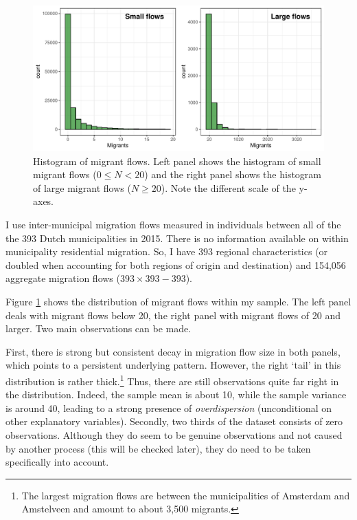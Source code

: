 \documentclass[fleqn,10pt]{SelfArx} %
\begin{document}
        \begin{figure}[t!]\centering %
          \includegraphics[width=0.8\linewidth]{../fig/hist_mig.pdf}
          \caption{Histogram of migrant flows. Left panel shows the
            histogram of small migrant flows ($0 \leq N < 20$) and the right
            panel shows the histogram of large migrant flows
            ($N \geq 20$). Note the different scale of the y-axes.}
          \label{fig:hist_mig}
        \end{figure}


        I use inter-municipal migration flows measured in individuals
        between all of the the 393 Dutch municipalities in 2015. There
        is no information available on within municipality residential
        migration. So, I have 393 regional characteristics (or doubled
        when accounting for both regions of origin and destination)
        and 154,056 aggregate migration flows ($393 \times 393 - 393$).

        Figure \ref{fig:hist_mig} shows the distribution of migrant
        flows within my sample. The left panel deals with migrant
        flows below 20, the right panel with migrant flows of 20 and
        larger. Two main observations can be made.

        First, there is strong but consistent decay in migration flow size in both panels,
        which points to a persistent underlying pattern. However, the
        right `tail' in this distribution is rather thick.\footnote{The
          largest migration flows are between the municipalities of
          Amsterdam and Amstelveen and amount to about 3,500
          migrants.} Thus, there are still observations quite far
        right in the distribution. Indeed, the sample mean is about
        10, while the sample variance is around 40, leading to a
        strong presence of \emph{overdispersion} (unconditional on
        other explanatory variables).  Secondly, two thirds of the
        dataset consists of zero observations. Although they do seem
        to be genuine observations and not caused by another process
        (this will be checked later), they do need to be taken
        specifically into account.
\end{document}
